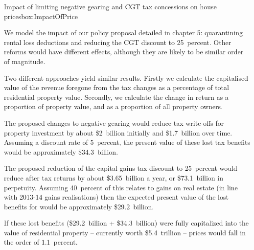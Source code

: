 \begin{bigboxC*}{Impact of limiting negative gearing {and CGT} tax concessions on house prices}{box:ImpactOfPrice}

We model the impact of our policy proposal detailed in chapter 5: quarantining rental loss deductions and reducing the CGT discount to 25~percent. Other reforms would have different effects, although they are likely to be similar order of magnitude.

Two different approaches yield similar results. Firstly we calculate the capitalised value of the revenue foregone from the tax changes as a percentage of total residential property value. Secondly, we calculate the change in return as a proportion of property value, and as a proportion of all property owners.



The proposed changes to negative gearing would reduce tax write-offs for property investment by about \$2~billion initially and \$1.7~billion over time. Assuming a discount rate of 
5~percent, the present value of these lost tax benefits would be approximately \$34.3~billion.


The proposed reduction of the capital gains tax discount to 25~percent would reduce after tax returns by about \$3.65~billion a year, or \$73.1~billion in perpetuity. Assuming 40~percent of this relates to gains on real estate (in line with 2013-14 gains realisations) then the expected present value of the lost benefits for would be approximately \$29.2~billion.



If these lost benefits (\$29.2~billion + \$34.3~billion) were fully capitalized into the value of residential property -- currently worth \$5.4~trillion -- prices would fall in the order of 1.1~percent.

\eject
\begin{table}[H]
\caption{Impact of policy changes on after-tax returns}\label{tbl:Impact-house-prices}
\end{table}
\end{bigboxC*}
